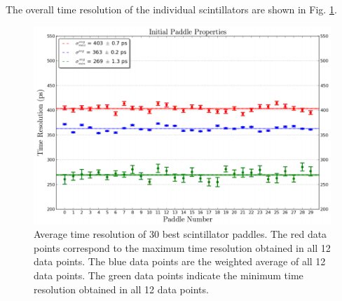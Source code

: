 The overall time resolution of the individual scintillators are shown in Fig. \ref{fig:final_30_tr_wrapped}.
\begin{figure}[!htb]
	\centering
	\includegraphics[width=1.0\columnwidth]{fabrication//figs/final_30_tr_wrapped}
	\caption[Average time resolution of the 30 best scintillator paddles]{Average time resolution of 30 best scintillator paddles.  The red data points correspond to the maximum time resolution obtained in all 12 data points. The blue data points are the weighted average of all 12 data points.  The green data points indicate the minimum time resolution obtained in all 12 data points.}
	\label{fig:final_30_tr_wrapped}
\end{figure}


